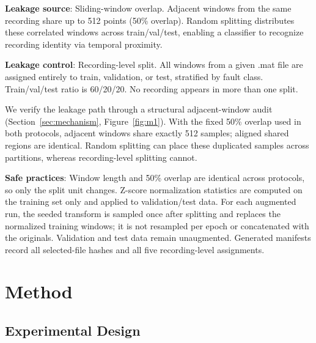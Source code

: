 ﻿\documentclass[11pt,a4paper]{article}
\begin{document}
\textbf{Leakage source}: Sliding-window overlap. Adjacent windows from the same recording share up to 512 points (50\% overlap). Random splitting distributes these correlated windows across train/val/test, enabling a classifier to recognize recording identity via temporal proximity.

\textbf{Leakage control}: Recording-level split. All windows from a given .mat file are assigned entirely to train, validation, or test, stratified by fault class. Train/val/test ratio is 60/20/20. No recording appears in more than one split.

We verify the leakage path through a structural adjacent-window audit (Section~\ref{sec:mechanism}, Figure~\ref{fig:m1}). With the fixed 50\% overlap used in both protocols, adjacent windows share exactly 512 samples; aligned shared regions are identical. Random splitting can place these duplicated samples across partitions, whereas recording-level splitting cannot.

\textbf{Safe practices}: Window length and 50\% overlap are identical across protocols, so only the split unit changes. Z-score normalization statistics are computed on the training set only and applied to validation/test data. For each augmented run, the seeded transform is sampled once after splitting and replaces the normalized training windows; it is not resampled per epoch or concatenated with the originals. Validation and test data remain unaugmented. Generated manifests record all selected-file hashes and all five recording-level assignments.

\section{Method}

\subsection{Experimental Design}
\end{document}

